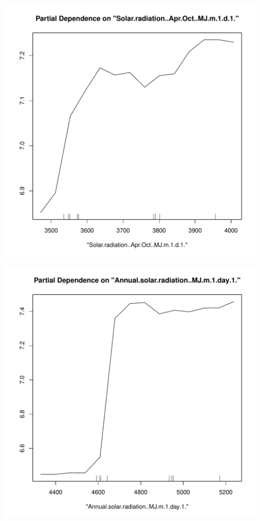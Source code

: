 \documentclass{article}\usepackage[]{graphicx}\usepackage[]{color}
\makeatletter
\def\maxwidth{ %
  \ifdim\Gin@nat@width>\linewidth
    \linewidth
  \else
    \Gin@nat@width
  \fi
}
\newenvironment{knitrout}{}{} %
\makeatother
\begin{document}
\begin{knitrout}
{}




{\centering \includegraphics[width=\maxwidth]{figure/OtherPartialDependence-3} 

}




{\centering \includegraphics[width=\maxwidth]{figure/OtherPartialDependence-4} 

}
\end{knitrout}
\end{document}
